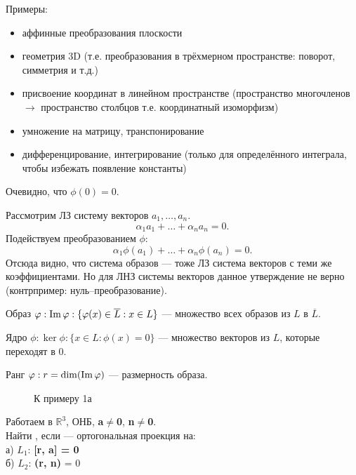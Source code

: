 Примеры:
\begin{itemize}
	\item аффинные преобразования плоскости
	\item геометрия 3D (т.е. преобразования в трёхмерном пространстве: поворот, симметрия и т.д.)
	\item присвоение координат в линейном пространстве (пространство многочленов $\rightarrow$ пространство столбцов т.е. координатный изоморфизм)
	\item умножение на матрицу, транспонирование
	\item дифференцирование, интегрирование (только для определённого интеграла, чтобы избежать появление константы)
\end{itemize}
Очевидно, что $\phi(0)=0$.

Рассмотрим ЛЗ систему векторов $a_1,\dots,a_n$.
$$
\alpha_1 a_1+\dots+\alpha_n a_n=0.
$$
Подействуем преобразованием $\phi$:
$$
\alpha_1 \phi(a_1)+\dots+\alpha_n \phi(a_n)=0.
$$
Отсюда видно, что \textsf{система образов} --- тоже ЛЗ система векторов с теми же коэффициентами. Но для ЛНЗ системы векторов данное утверждение не верно (контрпример: нуль--преобразование).

\begin{definition}
	\textsf{Образ} $\varphi: \operatorname{\mathop{Im}} \varphi:\{\varphi(x)\in \overline{L}:x\in L\}$ --- множество всех образов из $L$ в $\overline{L}$.
\end{definition}

\begin{definition}
	\textsf{Ядро} $\phi: \ker{\phi}: \{x\in L:\phi(x)=0\}$ --- множество векторов из $L$, которые переходят в 0.
\end{definition}

\begin{definition}
	\textsf{Ранг} $\varphi: r=\dim(\operatorname{\mathop{Im}}{\varphi})$ --- размерность образа.
\end{definition}

\begin{wrapfigure}{r}{0.27\linewidth}
	\def\svgwidth{5cm} %
	
	\caption{К примеру 1а}
	\label{...}
\end{wrapfigure}

\begin{prim}
	Работаем в $\mathbb{R}^3$, ОНБ, \textbf{a}$\neq$\textbf{0}, \textbf{n}$\neq$\textbf{0}.\\
	Найти \phi, если \phi --- ортогональная проекция на:\\
	а) $L_1$: \textbf{[r, a] = 0}\\
	б) $L_2$: \textbf{(r, n)} = 0
\end{prim}



